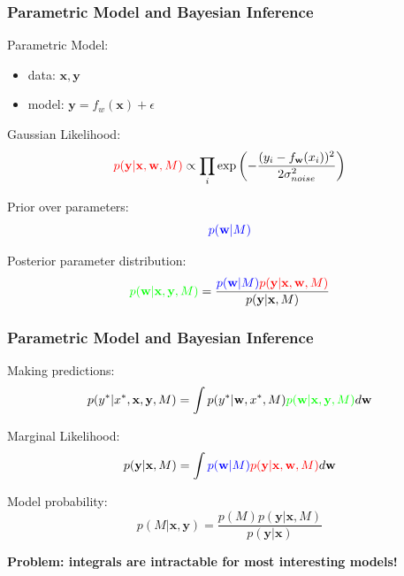 \documentclass[10pt]{beamer}
\newcommand{\bx}{\mathbf{x}}
\newcommand{\by}{\mathbf{y}}
\newcommand{\bw}{\mathbf{w}}
\begin{document}
  \begin{frame}
    \frametitle{Parametric Model and Bayesian Inference}
    Parametric Model:
      \begin{itemize}
        \item data: $\bx, \by$
        \item model: $\by = f_w(\bx) + \epsilon$
      \end{itemize}

    Gaussian Likelihood:
      \begin{equation*}
        \textcolor{red}{p(\by|\bx, \bw, M)} \propto \prod_i \exp \left( - \frac{ (y_i - f_{\bw}(x_i))^2}{2 \sigma_{noise}^2} \right)
      \end{equation*}

    Prior over parameters:
      \begin{equation*}
        \textcolor{blue}{p(\bw|M)}
      \end{equation*}

    Posterior parameter distribution:
      \begin{equation*}
        \textcolor{green}{p(\bw|\bx,\by,M)} = \frac{\textcolor{blue}{p(\bw|M)} \textcolor{red}{p(\by|\bx, \bw, M)}}{p(\by|\bx,M)}
      \end{equation*}
  \end{frame}

  \begin{frame}
    \frametitle{Parametric Model and Bayesian Inference}

    Making predictions:
      \begin{equation*}
        p(y^*|x^*,\bx,\by,M) = \int p(y^*|\bw,x^*,M) \textcolor{green}{p(\bw|\bx,\by,M)} d\bw
      \end{equation*}

    Marginal Likelihood:
      \begin{equation*}
        p(\by|\bx,M) = \int \textcolor{blue}{p(\bw|M)} \textcolor{red}{p(\by|\bx, \bw, M)} d\bw
      \end{equation*}

    Model probability:
      \begin{equation*}
        p(M|\bx,\by) = \frac{p(M)p(\by|\bx,M)}{p(\by|\bx)}
      \end{equation*}

    \begin{center}
      \textbf{Problem: integrals are intractable for most interesting models!}
    \end{center}
  \end{frame}
\end{document}
